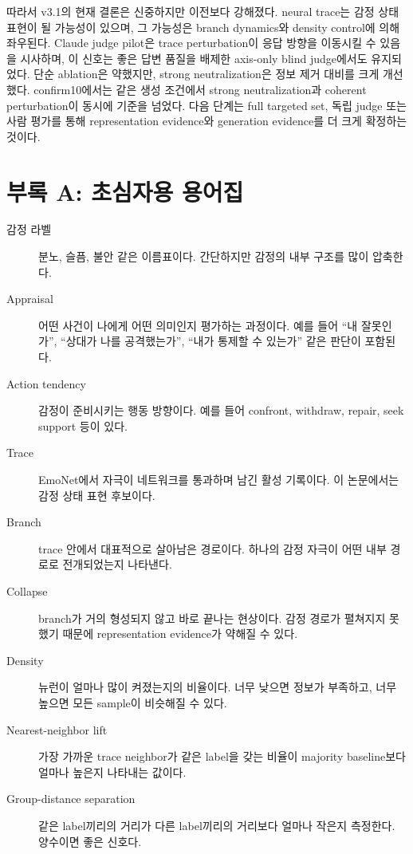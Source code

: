 \documentclass[11pt,a4paper]{article}
\begin{document}
따라서 v3.1의 현재 결론은 신중하지만 이전보다 강해졌다. neural trace는 감정 상태 표현이 될 가능성이 있으며, 그 가능성은 branch dynamics와 density control에 의해 좌우된다. Claude judge pilot은 trace perturbation이 응답 방향을 이동시킬 수 있음을 시사하며, 이 신호는 좋은 답변 품질을 배제한 axis-only blind judge에서도 유지되었다. 단순 ablation은 약했지만, strong neutralization은 정보 제거 대비를 크게 개선했다. confirm10에서는 같은 생성 조건에서 strong neutralization과 coherent perturbation이 동시에 기준을 넘었다. 다음 단계는 full targeted set, 독립 judge 또는 사람 평가를 통해 representation evidence와 generation evidence를 더 크게 확정하는 것이다.

\appendix

\section{부록 A: 초심자용 용어집}

\begin{description}
  \item[감정 라벨] 분노, 슬픔, 불안 같은 이름표이다. 간단하지만 감정의 내부 구조를 많이 압축한다.
  \item[Appraisal] 어떤 사건이 나에게 어떤 의미인지 평가하는 과정이다. 예를 들어 ``내 잘못인가'', ``상대가 나를 공격했는가'', ``내가 통제할 수 있는가'' 같은 판단이 포함된다.
  \item[Action tendency] 감정이 준비시키는 행동 방향이다. 예를 들어 confront, withdraw, repair, seek support 등이 있다.
  \item[Trace] EmoNet에서 자극이 네트워크를 통과하며 남긴 활성 기록이다. 이 논문에서는 감정 상태 표현 후보이다.
  \item[Branch] trace 안에서 대표적으로 살아남은 경로이다. 하나의 감정 자극이 어떤 내부 경로로 전개되었는지 나타낸다.
  \item[Collapse] branch가 거의 형성되지 않고 바로 끝나는 현상이다. 감정 경로가 펼쳐지지 못했기 때문에 representation evidence가 약해질 수 있다.
  \item[Density] 뉴런이 얼마나 많이 켜졌는지의 비율이다. 너무 낮으면 정보가 부족하고, 너무 높으면 모든 sample이 비슷해질 수 있다.
  \item[Nearest-neighbor lift] 가장 가까운 trace neighbor가 같은 label을 갖는 비율이 majority baseline보다 얼마나 높은지 나타내는 값이다.
  \item[Group-distance separation] 같은 label끼리의 거리가 다른 label끼리의 거리보다 얼마나 작은지 측정한다. 양수이면 좋은 신호다.
\end{description}
\end{document}
